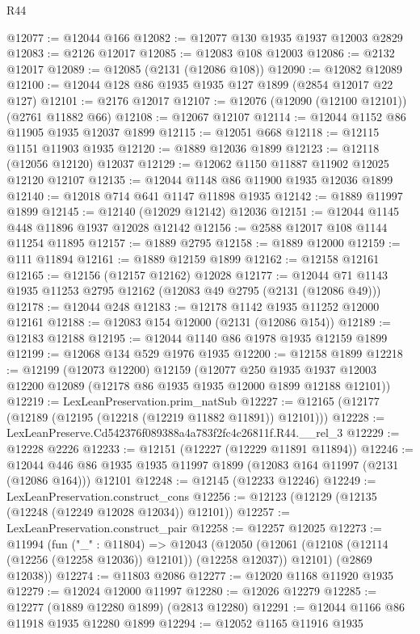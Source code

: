 \begin{lexlean}{R44}
\begin{coremodule}
@12077 := @12044 @166
@12082 := @12077 @130 @1935 @1937 @12003 @2829
@12083 := @2126 @12017
@12085 := @12083 @108 @12003
@12086 := @2132 @12017
@12089 := @12085 (@2131 (@12086 @108))
@12090 := @12082 @12089
@12100 := @12044 @128 @86 @1935 @1935 @127 @1899 (@2854 @12017 @22 @127)
@12101 := @2176 @12017
@12107 := @12076 (@12090 (@12100 @12101)) (@2761 @11882 @66)
@12108 := @12067 @12107
@12114 := @12044 @1152 @86 @11905 @1935 @12037 @1899
@12115 := @12051 @668
@12118 := @12115 @1151 @11903 @1935
@12120 := @1889 @12036 @1899
@12123 := @12118 (@12056 @12120) @12037
@12129 := @12062 @1150 @11887 @11902 @12025 @12120 @12107
@12135 := @12044 @1148 @86 @11900 @1935 @12036 @1899
@12140 := @12018 @714 @641 @1147 @11898 @1935
@12142 := @1889 @11997 @1899
@12145 := @12140 (@12029 @12142) @12036
@12151 := @12044 @1145 @448 @11896 @1937 @12028 @12142
@12156 := @2588 @12017 @108 @1144 @11254 @11895
@12157 := @1889 @2795
@12158 := @1889 @12000
@12159 := @111 @11894
@12161 := @1889 @12159 @1899
@12162 := @12158 @12161
@12165 := @12156 (@12157 @12162) @12028
@12177 := @12044 @71 @1143 @1935 @11253 @2795 @12162 (@12083 @49 @2795 (@2131 (@12086 @49)))
@12178 := @12044 @248
@12183 := @12178 @1142 @1935 @11252 @12000 @12161
@12188 := @12083 @154 @12000 (@2131 (@12086 @154))
@12189 := @12183 @12188
@12195 := @12044 @1140 @86 @1978 @1935 @12159 @1899
@12199 := @12068 @134 @529 @1976 @1935
@12200 := @12158 @1899
@12218 := @12199
    (@12073 @12200)
    @12159
    (@12077
      @250
      @1935
      @1937
      @12003
      @12200
      @12089
      (@12178 @86 @1935 @1935 @12000 @1899 @12188 @12101))
@12219 := LexLeanPreservation.prim_natSub
@12227 := @12165 (@12177 (@12189 (@12195 (@12218 (@12219 @11882 @11891)) @12101)))
@12228 := LexLeanPreserve.Cd542376f089388a4a783f2fc4c26811f.R44.__rel_3
@12229 := @12228 @2226
@12233 := @12151 (@12227 (@12229 @11891 @11894))
@12246 := @12044 @446 @86 @1935 @1935 @11997 @1899 (@12083 @164 @11997 (@2131 (@12086 @164))) @12101
@12248 := @12145 (@12233 @12246)
@12249 := LexLeanPreservation.construct_cons
@12256 := @12123 (@12129 (@12135 (@12248 (@12249 @12028 @12034)) @12101))
@12257 := LexLeanPreservation.construct_pair
@12258 := @12257 @12025
@12273 := @11994
    (fun ("_" : @11804) =>
    @12043
      (@12050 (@12061 (@12108 (@12114 (@12256 (@12258 @12036)) @12101)) (@12258 @12037)) @12101)
      (@2869 @12038))
@12274 := @11803 @2086
@12277 := @12020 @1168 @11920 @1935
@12279 := @12024 @12000 @11997
@12280 := @12026 @12279
@12285 := @12277 (@1889 @12280 @1899) (@2813 @12280)
@12291 := @12044 @1166 @86 @11918 @1935 @12280 @1899
@12294 := @12052 @1165 @11916 @1935

\end{coremodule}
\end{lexlean}
